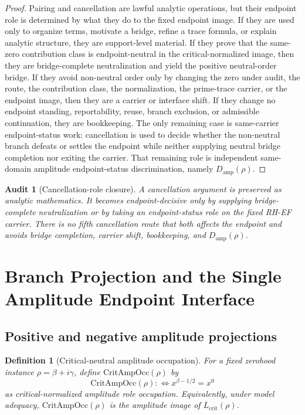\documentclass[11pt]{article}
\newtheorem{definition}{Definition}[section]
\newtheorem{audit}{Audit}[section]
\newcommand{\Lcrit}{L_{\mathrm{crit}}}
\newcommand{\CritAmpOcc}{\mathrm{CritAmpOcc}}
\newcommand{\Damp}{D_{\mathrm{amp}}}
\begin{document}
\begin{proof}
Pairing and cancellation are lawful analytic operations, but their endpoint role is determined by what they do to the fixed endpoint image.  If they are used only to organize terms, motivate a bridge, refine a trace formula, or explain analytic structure, they are support-level material.  If they prove that the same-zero contribution class is endpoint-neutral in the critical-normalized image, then they are bridge-complete neutralization and yield the positive neutral-order bridge.  If they avoid non-neutral order only by changing the zero under audit, the route, the contribution class, the normalization, the prime-trace carrier, or the endpoint image, then they are a carrier or interface shift.  If they change no endpoint standing, reportability, reuse, branch exclusion, or admissible continuation, they are bookkeeping.  The only remaining case is same-carrier endpoint-status work: cancellation is used to decide whether the non-neutral branch defeats or settles the endpoint while neither supplying neutral bridge completion nor exiting the carrier.  That remaining role is independent same-domain amplitude endpoint-status discrimination, namely \(\Damp(\rho)\).
\end{proof}

\begin{audit}[Cancellation-role closure]
A cancellation argument is preserved as analytic mathematics.  It becomes endpoint-decisive only by supplying bridge-complete neutralization or by taking an endpoint-status role on the fixed RH-EF carrier.  There is no fifth cancellation route that both affects the endpoint and avoids bridge completion, carrier shift, bookkeeping, and \(\Damp(\rho)\).
\end{audit}

\section{Branch Projection and the Single Amplitude Endpoint Interface}

\subsection{Positive and negative amplitude projections}

\begin{definition}[Critical-neutral amplitude occupation]
For a fixed zerohood instance \(\rho=\beta+i\gamma\), define \(\CritAmpOcc(\rho)\) by
\[
\CritAmpOcc(\rho) :\Longleftrightarrow x^{\beta-1/2}=x^0
\]
as critical-normalized amplitude role occupation.  Equivalently, under model adequacy, \(\CritAmpOcc(\rho)\) is the amplitude image of \(\Lcrit(\rho)\).
\end{definition}
\end{document}
